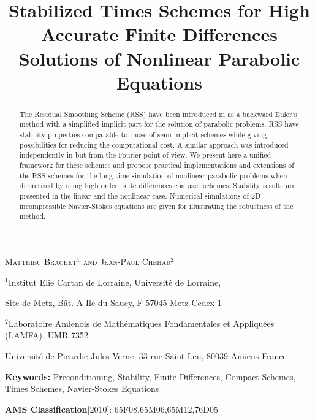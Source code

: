 \title{Stabilized Times Schemes for  High Accurate Finite Differences Solutions of Nonlinear Parabolic Equations}
\maketitle
\centerline{\scshape Matthieu Brachet$^{1}$ and Jean-Paul Chehab$^2$ 
}
\medskip
\centerline{$^{1}${\footnotesize Institut Elie Cartan de Lorraine, Universit\'e de Lorraine,  }} 
 \centerline{{\footnotesize Site de Metz, B\^at. A Ile du Saucy, F-57045 Metz Cedex 1 }}
{%
\centerline{$^{2}${\footnotesize Laboratoire Amienois de Math\'ematiques Fondamentales et Appliqu\'ees (LAMFA), {\small UMR} 7352}}
  \centerline{{\footnotesize Universit\'e de Picardie Jules Verne, 33 rue Saint Leu, 80039 Amiens France} }
  

\begin{abstract}
The Residual Smoothing Scheme (RSS) have been introduced in \cite{AverbuchCohenIsraeli} as a backward Euler's method with a simplified implicit part for the solution of parabolic problems. RSS have stability properties comparable to those of  semi-implicit schemes while giving possibilities for reducing  the computational cost. A similar approach was introduced independently in \cite{BCostaPHD,CDGT} but from the Fourier point of view. We present here
a unified  framework for these schemes and propose practical  implementations and extensions of the RSS schemes for the long time simulation of nonlinear parabolic problems when discretized by using high order finite differences compact schemes. Stability results are presented in the linear and the nonlinear case. Numerical simulations of 2D incompressible Navier-Stokes equations are given for illustrating the robustness of the method.
\end{abstract}

{\small 

{\bf Keywords:} {Preconditioning, Stability, Finite Differences, Compact Schemes, Times Schemes, Navier-Stokes Equations}

\hskip 0.2in{\bf  AMS Classification}[2010]: {65F08,65M06,65M12,76D05}}
}
